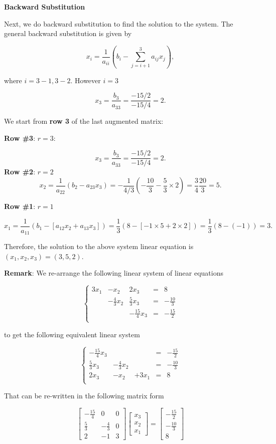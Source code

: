 \documentclass[
]{book}
\begin{document}
\textbf{Backward Substitution}

Next, we do backward substitution to find the solution to the system. The general backward substitution is given by

\[
x_i =\frac{1}{a_{ii}}\left(b_i-\sum_{j=i+1}^3 a_{ij}x_j \right),
\]

where \(i = 3-1, 3-2\). However \(i = 3\)

\[
x_3 =  \frac{b_3}{a_{33}} = \frac{-15/2}{-15/4} = 2.
\]

We start from \textbf{row 3} of the last augmented matrix:

\textbf{Row \#3}: \(r = 3\):

\[
x_3 = \frac{b_3}{a_{33}} = \frac{-15/2}{-15/4} = 2.
\]
\textbf{Row \#2}: \(r=2\)
\[
x_2 = \frac{1}{a_{22}}\left( b_2 - a_{23}x_3 \right)= -\frac{1}{4/3}\left(-\frac{10}{3} - \frac{5}{3}\times 2\right) = \frac{3}{4}\frac{20}{3} = 5.
\]

\textbf{Row \#1}: \(r = 1\)

\[
x_1 = \frac{1}{a_{11}} \left(b_1 -[a_{12}x_2 + a_{13}x_3]  \right) = \frac{1}{3}\left(8-[-1\times 5 + 2\times 2]\right) = \frac{1}{3}(8-(-1)) = 3. 
\]

Therefore, the solution to the above system linear equation is \((x_1, x_2, x_3) = (3, 5, 2)\).

\textbf{Remark}: We re-arrange the following linear system of linear equations

\[
\left\{
\begin{array}{ccccc} 
 3x_1 & - x_2 & 2x_3 & = & 8\\ 
   & -\frac{4}{3}x_2 & \frac{5}{3}x_3 & = & -\frac{10}{3}\\ 
   &  & -\frac{15}{4}x_3 & = & -\frac{15}{2}\\ 
\end{array}
\right.
\]

to get the following equivalent linear system

\[
\left\{
\begin{array}{ccccc} 
 -\frac{15}{4}x_3 &  &  & = & -\frac{15}{2}\\ 
  \frac{5}{3}x_3& -\frac{4}{3}x_2 &  & = & -\frac{10}{3}\\ 
 2x_3  & -x_2 & + 3x_1 & = & 8\\ 
\end{array}
\right.
\]

That can be re-written in the following matrix form

\[
\left[
\begin{array}{ccc}
 -\frac{15}{4} & 0 &  0 \\ 
 \frac{5}{3} & -\frac{4}{3} &  0 \\ 
 2&  -1 & 3 
\end{array}
\right]
\left[ \begin{array}{c} x_3 \\ x_2 \\ x_1  \end{array} \right]
=
\left[ \begin{array}{c}-\frac{15}{2} \\ -\frac{10}{3} \\ 8  \end{array} \right]
\]
\end{document}
